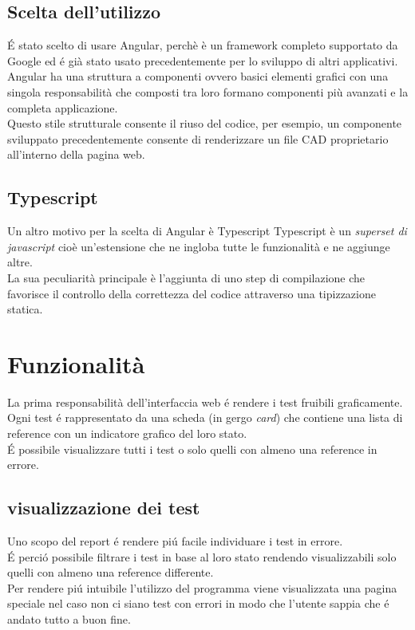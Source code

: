         \subsection{Scelta dell'utilizzo}
            \'E stato scelto di usare Angular, perchè è un framework completo supportato da Google
            ed \'e già stato usato precedentemente per lo sviluppo di altri applicativi.\\
            
            Angular ha una struttura a componenti ovvero basici elementi grafici con una singola responsabilità che composti tra loro formano componenti più avanzati e la completa applicazione.\\
            Questo stile strutturale consente il riuso del codice, per esempio, un componente sviluppato precedentemente consente
            di renderizzare un file CAD proprietario all'interno della pagina web.
        
        \subsection{Typescript}
            Un altro motivo per la scelta di Angular è Typescript \cite{Typescript}
            Typescript è un \textit{superset di javascript} cioè un'estensione che ne ingloba tutte le funzionalità e ne aggiunge altre.\\
            La sua peculiarità principale è l'aggiunta di uno step di compilazione che favorisce il controllo della correttezza del codice attraverso una tipizzazione statica.
    \section{Funzionalità}
        La prima responsabilità dell'interfaccia web \'e rendere i test fruibili graficamente.\\
        Ogni test \'e rappresentato da una scheda (in gergo \textit{card}) che contiene una lista di reference con un indicatore grafico del loro stato.\\
        \'E possibile visualizzare tutti i test o solo quelli con almeno una reference in errore.\\
        \subsection{visualizzazione dei test}        
            Uno scopo del report \'e rendere pi\'u facile individuare i test in errore.\\
            \'E perci\'o possibile filtrare i test in base al loro stato rendendo visualizzabili solo quelli con almeno una reference differente.\\
            Per rendere pi\'u intuibile l'utilizzo del programma viene visualizzata una pagina speciale nel caso non ci siano test con errori in modo che l'utente sappia che \'e andato tutto a buon fine.

